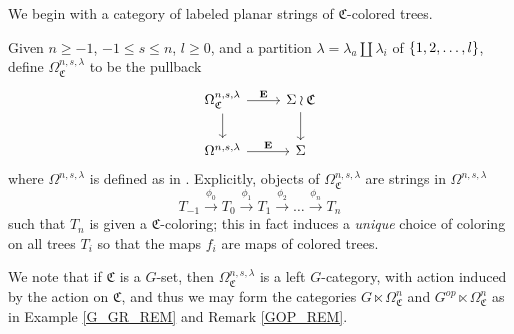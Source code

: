 \documentclass[a4paper,10pt
,draft
]{article}%
\renewcommand{\1}{\eta}%
\newcommand{\OC}{\Omega_{\mathfrak C}}
\begin{document}
We begin with a category of labeled planar strings of $\mathfrak C$-colored trees.
\begin{definition}
      \label{CLPS_DEF}
      Given $n\geq -1$, $-1 \leq s \leq n$, $l \geq 0$, and a partition $\lambda = \lambda_a \amalg \lambda_i$ of $\left\{1,2,\dots,l\right\}$,
      define $\Omega_{\mathfrak C}^{n,s,\lambda}$ to be the pullback
      \begin{equation}
            \begin{tikzcd}
                  \OC^{n,s,\lambda} \arrow[d] \arrow[r, "\mathbf E"]
                  &
                  \Sigma \wr \mathfrak C \arrow[d]
                  \\
                  \Omega^{n,s,\lambda} \arrow[r, "\mathbf E"]
                  &
                  \Sigma
            \end{tikzcd}
      \end{equation}
      where $\Omega^{n,s,\lambda}$ is defined as in \cite[Defn. 5.10]{BP_geo}.
      Explicitly, objects of $\Omega_{\mathfrak C}^{n,s,\lambda}$ are strings in $\Omega^{n,s,\lambda}$
      \begin{equation}
            T_{-1} \xrightarrow{\phi_0} T_0 \xrightarrow{\phi_1} T_1 \xrightarrow{\phi_2} \dots \xrightarrow{\phi_n} T_n
      \end{equation}
      such that $T_n$ is given a $\mathfrak C$-coloring;
      this in fact induces a \textit{unique} choice of coloring on all trees $T_i$ so that the maps $f_i$ are maps of colored trees.
\end{definition}

\begin{remark}
      We note that if $\mathfrak C$ is a $G$-set, then
      $\OC^{n,s,\lambda}$ is a left $G$-category, with action induced by the action on $\mathfrak C$,
      and thus we may form the categories $G \ltimes \OC^n$ and $G^{op} \ltimes \OC^n$ as in Example \ref{G_GR_REM} and Remark \ref{GOP_REM}.
\end{remark}
\end{document}
